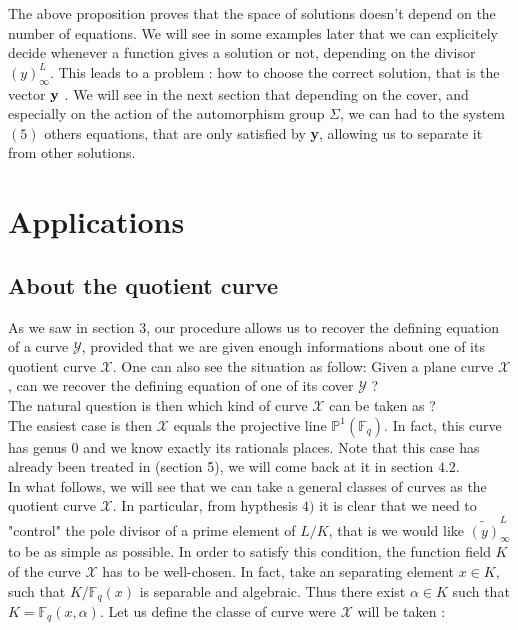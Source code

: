 \documentclass[10pt]{article}
\newcommand{\s}{\vspace{0.3cm}}
\newcommand{\fq}{\mathbb{F}_q}
\newcommand{\X}{\mathcal{X}}
\newcommand{\Y}{\mathcal{Y}}
\begin{document}
\s

The above proposition proves that the space of solutions doesn't depend on the number of equations. 
We will see in some examples later that we can explicitely decide whenever a function gives a solution or not, depending on the divisor $(y)^L_{\infty}$. This leads to a problem : how to choose the correct solution, that is the vector $\bf{y}$ \rm. We will see in the next section that depending on the cover, and especially on the action of the automorphism group $\Sigma$,  we can had to the system $(5)$ others equations, that are only satisfied by \textbf{y}, allowing us to separate it from other solutions.

\s
\section{Applications}

\s

\subsection{About the quotient curve}

\s


As we saw in section 3, our procedure allows us to recover the defining equation of a curve $\Y$, provided that we are given enough informations about one of its quotient curve $\X$. One can also see the situation as follow: Given a plane curve $\X$, can we recover the defining equation of one of its cover $\Y$ ? \\ The natural question is then which kind of curve $\X$ can be taken as ? \\

The easiest case is then $\X$ equals the projective line $\mathbb{P}^1(\fq)$. In fact, this curve has genus 0 and we know exactly its rationals places. Note that this case has already been treated in \cite{Bar} (section 5), we will come back at it in section $4.2$.
\\

In what follows, we will see that we can take a general classes of curves as the quotient curve $\X$. In particular, from hypthesis $4)$ it is clear that we need to "control" the pole divisor of a prime element of $L/K$, that is we would like $\widetilde{(y)}^L_{\infty}$ to be as simple as possible. In order to satisfy this condition, the function field $K$ of the curve $\X$ has to be well-chosen. In fact, take an separating element $x \in K$, such that $K/\fq(x)$ is separable and algebraic. Thus there exist $\alpha \in K$ such that $K=\fq(x,\alpha)$. Let us define the classe of curve were $\X$ will be taken :
\end{document}
